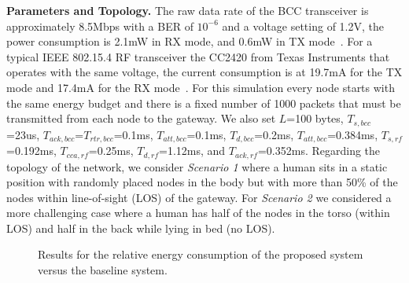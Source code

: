 \documentclass[10pt]{IEEEtran}
\begin{document}
\textbf{Parameters and Topology.} The raw data rate of the BCC transceiver is approximately 8.5Mbps with a BER of $10^{-6}$ and a voltage setting of 1.2V, the power consumption is 2.1mW in RX mode, and 0.6mW in TX mode~\cite{fazzi09}. For a typical IEEE 802.15.4 RF transceiver the CC2420 from Texas Instruments that operates with the same voltage, the current consumption is  at 19.7mA for the TX mode and 17.4mA for the RX mode~\cite{cc2420}. For this simulation every node starts with the same energy budget and there is a fixed number of 1000 packets that must be transmitted from each node to the gateway. We also set $L$=100 bytes, $T_{s,bcc}$=23us, $T_{ack,bcc}$=$T_{rtr,bcc}$=0.1ms, $T_{att,bcc}$=0.1ms, $T_{d,bcc}$=0.2ms, $T_{att,bcc}$=0.384ms, $T_{s,rf}$=0.192ms, $T_{cca,rf}$=0.25ms, $T_{d,rf}$=1.12ms, and $T_{ack,rf}$=0.352ms. Regarding the topology of the network, we consider \emph{Scenario 1} where a human sits in a static position with randomly placed nodes in the body but with more than 50\% of the nodes within line-of-sight (LOS) of the gateway. For \emph{Scenario 2} we considered a more challenging case where a human has half of the nodes in the torso (within LOS) and half in the back while lying in bed (no LOS).

\begin{figure}[t]
\begin{center}
\caption{Results for the relative energy consumption of the proposed system versus the baseline system.}
\label{fig:energy-vs-snr}
\end{center}
\end{figure}
\end{document}
